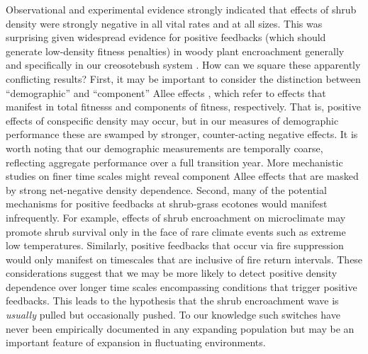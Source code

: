 \documentclass[11pt]{article}\usepackage[]{graphicx}\usepackage[usenames,dvipsnames]{xcolor}
\begin{document}
Observational and experimental evidence strongly indicated that effects of shrub density were strongly negative in all vital rates and at all sizes.
This was surprising given widespread evidence for positive feedbacks (which should generate low-density fitness penalties) in woody plant encroachment generally \citep{d2013vegetation} and specifically in our creosotebush system \citep{d2010positive}. 
How can we square these apparently conflicting results?
First, it may be important to consider the distinction between ``demographic'' and ``component'' Allee effects \citep{stephens1999allee}, which refer to effects that manifest in total fitnesss and components of fitness, respectively. 
That is, positive effects of conspecific density may occur, but in our measures of demographic performance these are swamped by stronger, counter-acting negative effects.
It is worth noting that our demographic measurements are temporally coarse, reflecting aggregate performance over a full transition year.
More mechanistic studies on finer time scales might reveal component Allee effects that are masked by strong net-negative density dependence. 
Second, many of the potential mechanisms for positive feedbacks at shrub-grass ecotones would manifest infrequently. 
For example, effects of shrub encroachment on microclimate \citep{d2013vegetation} may promote shrub survival only in the face of rare climate events such as extreme low temperatures.
Similarly, positive feedbacks that occur via fire suppression \citep{ratajczak2011positive,collins2021fire} would only manifest on timescales that are inclusive of fire return intervals. 
These considerations suggest that we may be more likely to detect positive density dependence over longer time scales encompassing conditions that trigger positive feedbacks. 
This leads to the hypothesis that the shrub encroachment wave is \emph{usually} pulled but occasionally pushed.
To our knowledge such switches have never been empirically documented in any expanding population but may be an important feature of expansion in fluctuating environments. 
\end{document}
